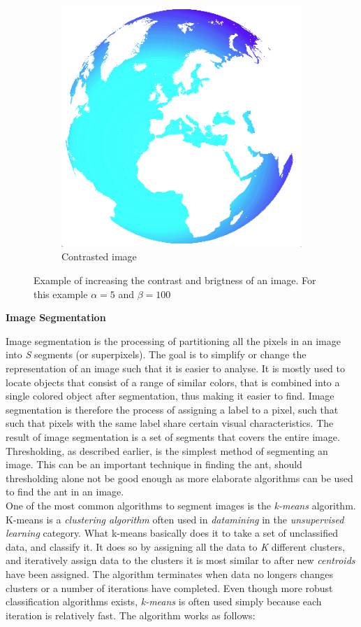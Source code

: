\begin{figure}
\begin{subfigure}[b]{0.3\textwidth}
                \includegraphics[scale = 0.2]{img/globeContrast}
                \caption{Contrasted image}
        \end{subfigure}
		\caption{Example of increasing the contrast and brigtness of an image. For this example $\alpha = 5$ and $\beta = 100$}
		\label{fig:bright_contrast}
\end{figure}

\noindent \textbf{Image Segmentation} \par
Image segmentation is the processing of partitioning all the pixels in an image into \textit{S} segments (or superpixels). The goal is to simplify or change the representation of an image such that it is easier to analyse. It is mostly used to locate objects that consist of a range of similar colors, that is combined into a single colored object after segmentation, thus making it easier to find. Image segmentation is therefore the process of assigning a label to a pixel, such that such that pixels with the same label share certain visual characteristics. The result of image segmentation is a set of segments that covers the entire image. Thresholding, as described earlier, is the simplest method of segmenting an image. This can be an important technique in finding the ant, should thresholding alone not be good enough as more elaborate algorithms can be used to find the ant in an image.\\

One of the most common algorithms to segment images is the \textit{k-means} algorithm. K-means is a \textit{clustering algorithm} often used in \textit{datamining} in the \textit{unsupervised learning} category. What k-means basically does it to take a set of unclassified data, and classify it. It does so by assigning all the data to \textit{K} different clusters, and iteratively assign data to the clusters it is most similar to after new \textit{centroids} have been assigned. The algorithm terminates when data no longers changes clusters or a number of iterations have completed. Even though more robust classification algorithms exists, \textit{k-means} is often used simply because each iteration is relatively fast. The algorithm works as follows:

